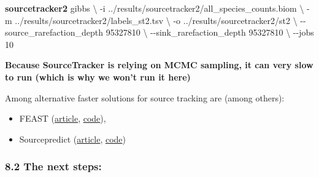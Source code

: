 \documentclass[
  letterpaper,
]{book}
\newenvironment{Shaded}{}{}
\newcommand{\AttributeTok}[1]{\textcolor[rgb]{0.84,0.23,0.29}{#1}}
\newcommand{\DataTypeTok}[1]{\textcolor[rgb]{0.84,0.23,0.29}{#1}}
\newcommand{\ExtensionTok}[1]{\textcolor[rgb]{0.84,0.23,0.29}{\textbf{#1}}}
\newcommand{\NormalTok}[1]{\textcolor[rgb]{0.14,0.16,0.18}{#1}}
\providecommand{\tightlist}{%
  \setlength{\itemsep}{0pt}\setlength{\parskip}{0pt}}\usepackage{longtable,booktabs,array}
\begin{document}
\begin{Shaded}
\begin{Highlighting}[]
\ExtensionTok{sourcetracker2}\NormalTok{ gibbs }\DataTypeTok{\textbackslash{}}
    \AttributeTok{{-}i}\NormalTok{ ../results/sourcetracker2/all\_species\_counts.biom }\DataTypeTok{\textbackslash{}}
    \AttributeTok{{-}m}\NormalTok{ ../results/sourcetracker2/labels\_st2.tsv }\DataTypeTok{\textbackslash{}}
    \AttributeTok{{-}o}\NormalTok{ ../results/sourcetracker2/st2 }\DataTypeTok{\textbackslash{}}
    \AttributeTok{{-}{-}source\_rarefaction\_depth}\NormalTok{ 95327810 }\DataTypeTok{\textbackslash{}}
    \AttributeTok{{-}{-}sink\_rarefaction\_depth}\NormalTok{ 95327810 }\DataTypeTok{\textbackslash{}}
    \AttributeTok{{-}{-}jobs}\NormalTok{ 10}
\end{Highlighting}
\end{Shaded}

\textbf{Because SourceTracker is relying on MCMC sampling, it can very
slow to run (which is why we won't run it here)}

Among alternative faster solutions for source tracking are (among
others):

\begin{itemize}
\tightlist
\item
  FEAST (\href{https://doi.org/10.1038/s41592-019-0431-x}{article},
  \href{https://github.com/cozygene/FEAST}{code}),
\item
  Sourcepredict (\href{https://doi.org/10.21105/joss.01540}{article},
  \href{https://github.com/maxibor/sourcepredict}{code})
\end{itemize}

\hypertarget{the-next-steps}{%
\subsubsection{8.2 The next steps:}\label{the-next-steps}}
\end{document}
